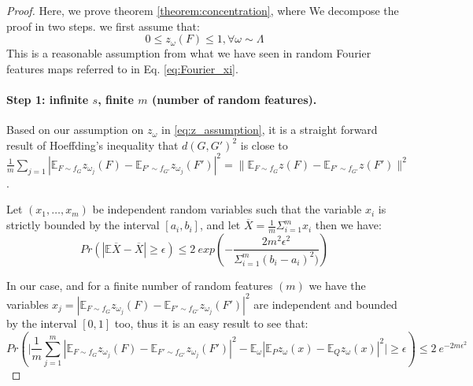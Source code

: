 \begin{proof}
Here, we prove theorem \ref{theorem:concentration}, where We decompose the proof in two steps.
we first assume that:
\begin{equation}
\label{eq:z_assumption}
    0\leq z_\omega(F)\leq 1, \forall \omega \sim  \Lambda
\end{equation}
This is a reasonable assumption from what we have seen in random Fourier features maps referred to in Eq. \ref{eq:Fourier_xi}.
\paragraph{Step 1: infinite $s$, finite $m$ (number of random features).} Based on our assumption on $z_\omega$ in \eqref{eq:z_assumption}, it is a straight forward result of Hoeffding's inequality that  $d(G, G')^2$ is close to $\frac{1}{m} \sum_{j=1} | \mathbb{E}_{F \sim f_G} z_{\omega_j}(F) - \mathbb{E}_{F' \sim f_{G'}} z_{\omega_j}(F') |^2 = \| \mathbb{E}_{F \sim f_G} z(F) - \mathbb{E}_{F' \sim f_{G'}} z(F')\|^2$.  
\begin{lemma} 
Let $(x_1,\ldots, x_m)$ be independent random variables such that the variable $x_i$ is strictly bounded by the interval $[a_i , b_i]$, and let $\overline{X}=\frac{1}{m}\Sigma_{i=1}^{m}x_i$ then we have:
\begin{equation}
\label{eq:Hoeffding}
    Pr(|\mathbb{E}\overline{X}-\overline{X}|\geq \epsilon)\leq 2~ exp (-\frac{2m^2\epsilon^2}{\Sigma_{i=1}^m(b_i-a_i)^2)})
\end{equation}

\end{lemma}
In our case, and for a finite number of random features $(m)$ we have the variables $x_j=| \mathbb{E}_{F \sim f_G} z_{\omega_j}(F) - \mathbb{E}_{F' \sim f_{G'}} z_{\omega_j}(F') |^2 $ are independent and bounded by the interval $[0,1]$ too, thus it is an easy result to see that:
\begin{equation}
    Pr(\Big|\frac{1}{m} \sum_{j=1}^m | \mathbb{E}_{F \sim f_G} z_{\omega_j}(F) - \mathbb{E}_{F' \sim f_{G'}} z_{\omega_j}(F') |^2 - \mathbb{E}_{\omega}  | \mathbb{E}_P z_\omega(x) - \mathbb{E}_Q z_\omega(x) |^2 \Big| \geq \epsilon) \leq 2~ e^{ -2m\epsilon^2}
\end{equation}


\end{proof}
